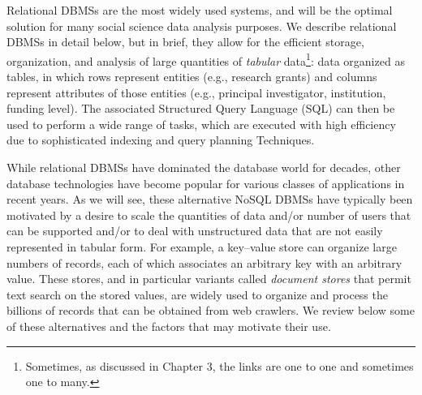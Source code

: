 \documentclass[]{krantz}
\begin{document}
Relational DBMSs are the most widely used systems, and will be the
optimal solution for many social science data analysis purposes. We
describe relational DBMSs in detail below, but in brief, they allow for
the efficient storage, organization, and analysis of large quantities of
\emph{tabular} data\footnote{Sometimes, as discussed in Chapter 3, the
  links are one to one and sometimes one to many.}: data organized as
tables, in which rows represent entities (e.g., research grants) and
columns represent attributes of those entities (e.g., principal
investigator, institution, funding level). The associated Structured
Query Language (SQL) can then be used to perform a wide range of tasks,
which are executed with high efficiency due to sophisticated indexing
and query planning Techniques.

While relational DBMSs have dominated the database world for decades,
other database technologies have become popular for various classes of
applications in recent years. As we will see, these alternative NoSQL
DBMSs have typically been motivated by a desire to scale the quantities
of data and/or number of users that can be supported and/or to deal with
unstructured data that are not easily represented in tabular form. For
example, a key--value store can organize large numbers of records, each
of which associates an arbitrary key with an arbitrary value. These
stores, and in particular variants called \emph{document stores} that
permit text search on the stored values, are widely used to organize and
process the billions of records that can be obtained from web crawlers.
We review below some of these alternatives and the factors that may
motivate their use.
\end{document}
